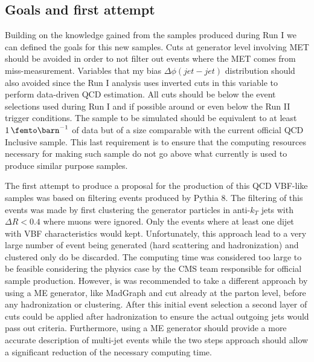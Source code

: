 \subsection{Goals and first attempt}
\label{SUBSECTION:RunIIPreparation_GoalsAndFirstAttempt}


Building on the knowledge gained from the samples produced during Run I we can defined the goals for this new samples. Cuts at generator level involving \gls{MET} should be avoided in order to not filter out events where the \gls{MET} comes from miss-measurement. Variables that my bias $\Delta\phi(jet-jet)$ distribution should also avoided since the Run I analysis uses inverted cuts in this variable to perform data-driven \gls{QCD} estimation. All cuts should be below the event selections used during Run I and if possible around or even below the Run II trigger conditions. The sample to be simulated should be equivalent to at least $1\,\femto\barn^{-1}$ of data but of a size comparable with the current official \gls{QCD} Inclusive sample. This last requirement is to ensure that the computing resources necessary for making such sample do not go above what currently is used to produce similar purpose samples. 

The first attempt to produce a proposal for the production of this QCD VBF-like samples was based on filtering events produced by Pythia 8. The filtering of this events was made by first clustering the generator particles in anti-$k_T$ jets with $\Delta R<0.4$ where muons were ignored. Only the events where at least one dijet with \gls{VBF} characteristics would kept. Unfortunately, this approach lead to a very large number of event being generated (hard scattering and hadronization) and clustered only do be discarded. The computing time was considered too large to be feasible considering the physics case by the \gls{CMS} team responsible for official sample production. However, is was recommended to take a different approach by using a \gls{ME} generator, like MadGraph and cut already at the parton level, before any hadronization or clustering. After this initial event selection a second layer of cuts could be applied after hadronization to ensure the actual outgoing jets would pass out criteria. Furthermore, using a \gls{ME} generator should provide a more accurate description of multi-jet events while the two steps approach should allow a significant reduction of the necessary computing time. 

